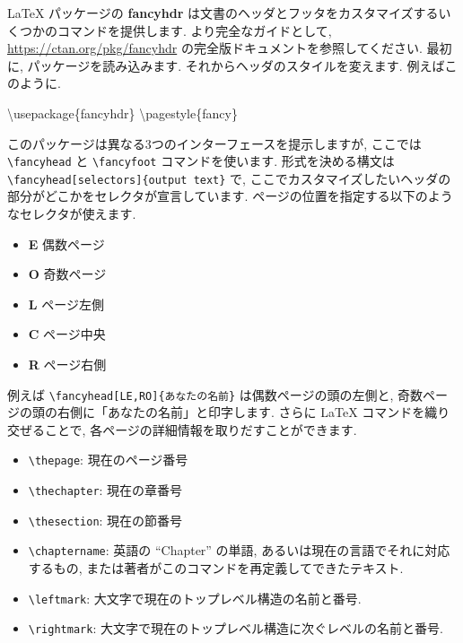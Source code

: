 \documentclass[
  11pt,
]{bxjsreport}
\newenvironment{Shaded}{\begin{snugshade}}{\end{snugshade}}
\newcommand{\BuiltInTok}[1]{#1}
\newcommand{\ExtensionTok}[1]{#1}
\newcommand{\FunctionTok}[1]{\textcolor[rgb]{0.00,0.00,0.00}{#1}}
\newcommand{\NormalTok}[1]{#1}
\providecommand{\tightlist}{%
  \setlength{\itemsep}{0pt}\setlength{\parskip}{0pt}}
\begin{document}
LaTeX パッケージの \textbf{fancyhdr} は文書のヘッダとフッタをカスタマイズするいくつかのコマンドを提供します. より完全なガイドとして, \url{https://ctan.org/pkg/fancyhdr} の完全版ドキュメントを参照してください. 最初に, パッケージを読み込みます. それからヘッダのスタイルを変えます. 例えばこのように.

\begin{Shaded}
\begin{Highlighting}[]
\BuiltInTok{\textbackslash{}usepackage}\NormalTok{\{}\ExtensionTok{fancyhdr}\NormalTok{\}}
\FunctionTok{\textbackslash{}pagestyle}\NormalTok{\{fancy\}}
\end{Highlighting}
\end{Shaded}

このパッケージは異なる3つのインターフェースを提示しますが, ここでは \texttt{\textbackslash{}fancyhead} と \texttt{\textbackslash{}fancyfoot} コマンドを使います. 形式を決める構文は \texttt{\textbackslash{}fancyhead{[}selectors{]}\{output\ text\}} で, ここでカスタマイズしたいヘッダの部分がどこかをセレクタが宣言しています. ページの位置を指定する以下のようなセレクタが使えます.

\begin{itemize}
\tightlist
\item
  \textbf{E} 偶数ページ
\item
  \textbf{O} 奇数ページ
\item
  \textbf{L} ページ左側
\item
  \textbf{C} ページ中央
\item
  \textbf{R} ページ右側
\end{itemize}

例えば \texttt{\textbackslash{}fancyhead{[}LE,RO{]}\{あなたの名前\}} は偶数ページの頭の左側と, 奇数ページの頭の右側に「あなたの名前」と印字します. さらに LaTeX コマンドを織り交ぜることで, 各ページの詳細情報を取りだすことができます.

\begin{itemize}
\tightlist
\item
  \texttt{\textbackslash{}thepage}: 現在のページ番号
\item
  \texttt{\textbackslash{}thechapter}: 現在の章番号
\item
  \texttt{\textbackslash{}thesection}: 現在の節番号
\item
  \texttt{\textbackslash{}chaptername}: 英語の ``Chapter'' の単語, あるいは現在の言語でそれに対応するもの, または著者がこのコマンドを再定義してできたテキスト.
\item
  \texttt{\textbackslash{}leftmark}: 大文字で現在のトップレベル構造の名前と番号.
\item
  \texttt{\textbackslash{}rightmark}: 大文字で現在のトップレベル構造に次ぐレベルの名前と番号.
\end{itemize}
\end{document}
